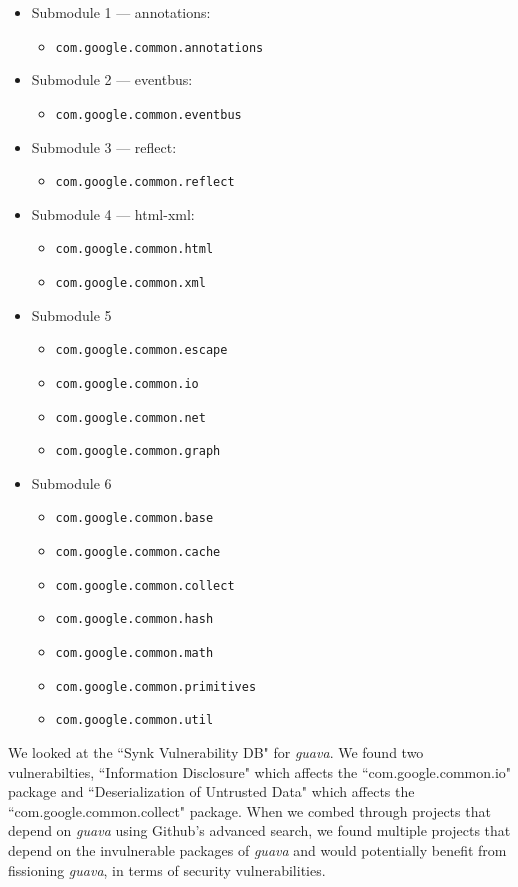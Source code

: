\begin{itemize}
\item Submodule 1 --- annotations:
\begin{itemize}
\item \texttt{com.google.common.annotations}
\end{itemize}
\item Submodule 2 --- eventbus:
\begin{itemize}
\item \texttt{com.google.common.eventbus}
\end{itemize}
\item Submodule 3 --- reflect:
\begin{itemize}
\item \texttt{com.google.common.reflect}
\end{itemize}
\item Submodule 4 --- html-xml:
\begin{itemize}
\item \texttt{com.google.common.html}
\item \texttt{com.google.common.xml}
\end{itemize}
\item Submodule 5
\begin{itemize}
\item \texttt{com.google.common.escape}
\item \texttt{com.google.common.io}
\item \texttt{com.google.common.net}
\item \texttt{com.google.common.graph}
\end{itemize}
\item Submodule 6
\begin{itemize}
\item \texttt{com.google.common.base}
\item \texttt{com.google.common.cache}
\item \texttt{com.google.common.collect}
\item \texttt{com.google.common.hash}
\item \texttt{com.google.common.math}
\item \texttt{com.google.common.primitives}
\item \texttt{com.google.common.util}
\end{itemize}
\end{itemize}

We looked at the ``Synk Vulnerability DB" for \emph{guava}. We found two vulnerabilties, ``Information Disclosure" which affects the ``com.google.common.io" package and ``Deserialization of Untrusted Data" which affects the ``com.google.common.collect" package. When we combed through projects that depend on \emph{guava} using Github's advanced search, we found multiple projects that depend on the invulnerable packages of \emph{guava} and would potentially benefit from fissioning \emph{guava}, in terms of security vulnerabilities.


